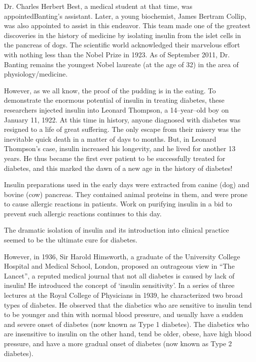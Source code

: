Dr. Charles Herbert Best, a medical student at that time, was appointed\break Banting’s assistant. Later, a young biochemist, James Bertram Collip, was also appointed to assist in this endeavor. This team made one of the greatest disco\-veries in the history of medicine by isolating insu\-lin from the islet cells in the pancreas of dogs. The scientific world acknow\-ledged their marvelous effort with no\-thing less than the Nobel Prize in 1923. As of September 2011, Dr. Banting remains the youngest Nobel laureate (at the age of 32) in the area of physio\-logy/medicine.

However, as we all know, the proof of the pudding is in the eating. To demonstrate the enormous potential of insulin in treating diabetes, these researchers injected insulin into Leonard Thompson, a 14–year–old boy on January 11, 1922. At this time in history, anyone diagnosed with diabetes was resigned to a life of great suffering. The only es\-cape from their misery was the inevitable quick death in a matter of days to months. But, in Leonard Thompson’s case, insulin increased his longevity, and he lived for another 13 years. He thus became the first ever patient to be successfully treated for diabetes, and this marked the dawn of a new age in the history of diabetes!

Insulin preparations used in the early days were extracted from canine (dog) and bovine (cow) pancreas. They contained animal proteins in them, and were prone to cause allergic rea\-ctions in patients. Work on purifying insulin in a bid to prevent such allergic reactions continues to this day.

The dramatic isolation of insulin and its introduction into clinical practice seemed to be the ultimate cure for diabetes.

However, in 1936, Sir Harold Himsworth, a graduate of the University College Hospital and Medical School, London, proposed an outrageous view in “The Lancet”, a reputed medical journal that not all diabetes is caused by lack of insulin! He introduced the concept of ‘insulin sensitivity’. In a series of three lectures at the Royal College of Physicians in 1939, he characte\-rized two broad types of diabetes. He observed that the diabe\-tics who are sensitive to insulin tend to be younger and thin with normal blood pressure, and usually have a sudden and severe onset of diabetes (now known as Type 1 diabetes). The diabetics who are insensitive to insulin on the other hand, tend be older, obese, have high blood pressure, and have a more gradual onset of diabetes (now known as Type 2 diabetes).

